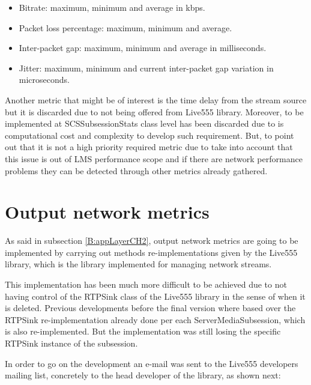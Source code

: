 \begin{itemize}
\item Bitrate: maximum, minimum and average in kbps.
\item Packet loss percentage: maximum, minimum and average.
\item Inter-packet gap: maximum, minimum and average in milliseconds.
\item Jitter: maximum, minimum and current inter-packet gap variation in microseconds.
\end{itemize}

Another metric that might be of interest is the time delay from the stream source but it is discarded due to not being offered from Live555 library. Moreover, to be implemented at SCSSubsessionStats class level has been discarded due to is computational cost and complexity to develop such requirement. But, to point out that it is not a high priority required metric due to take into account that this issue is out of LMS performance scope and if there are network performance problems they can be detected through other metrics already gathered.


\section{Output network metrics}

As said in subsection \ref{B:appLayerCH2}, output network metrics are going to be implemented by carrying out methods re-implementations given by the Live555 library, which is the library implemented for managing network streams.

This implementation has been much more difficult to be achieved due to not having control of the RTPSink class of the Live555 library in the sense of when it is deleted. Previous developments before the final version where based over the RTPSink re-implementation already done per each ServerMediaSubsession, which is also re-implemented. But the implementation was still losing the specific RTPSink instance of the subsession.

In order to go on the development an e-mail was sent to the Live555 developers mailing list, concretely to the head developer of the library, as shown next:


